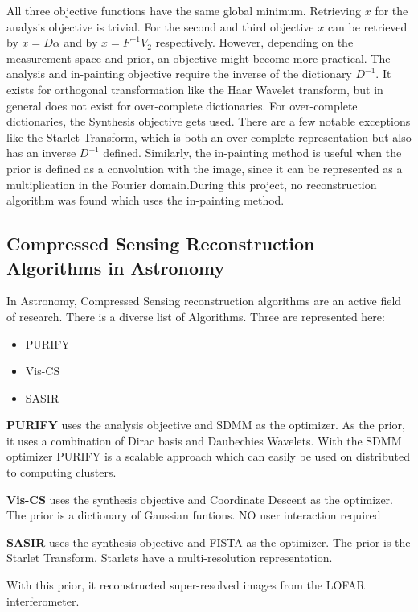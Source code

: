 All three objective functions have the same global minimum. Retrieving $x$ for the analysis objective is trivial. For the second and third objective $x$ can be retrieved by $x = D\alpha$ and by $x = F^{-1}V_2$ respectively. However, depending on the measurement space and prior, an objective might become more practical. The analysis and in-painting objective require the inverse of the dictionary $D^{-1}$. It exists for orthogonal transformation like the Haar Wavelet transform, but in general does not exist for over-complete dictionaries. For over-complete dictionaries, the Synthesis objective gets used. There are a few notable exceptions like the Starlet Transform, which is both an over-complete representation but also has an inverse $D^{-1}$ defined. Similarly, the in-painting method is useful when the prior is defined as a convolution with the image, since it can be represented as a multiplication in the Fourier domain.During this project, no reconstruction algorithm was found which uses the in-painting method.


\subsection{Compressed Sensing Reconstruction Algorithms in Astronomy}
In Astronomy, Compressed Sensing reconstruction algorithms are an active field of research. There is a diverse list of Algorithms. Three are represented here:
\begin{itemize}
	\item PURIFY \cite{carrillo2014purify}
	\item Vis-CS \cite{felix2017compressed}
	\item SASIR \cite{girard2015sparse}
\end{itemize}

\textbf{PURIFY} uses the analysis objective and SDMM as the optimizer. As the prior, it uses a combination of Dirac basis and Daubechies Wavelets. With the SDMM optimizer PURIFY is a scalable approach which can easily be used on distributed to computing clusters.

\textbf{Vis-CS} uses the synthesis objective and Coordinate Descent as the optimizer. The prior is a dictionary of Gaussian funtions.
 NO user interaction required

\textbf{SASIR} uses the synthesis objective and FISTA as the optimizer. The prior is the Starlet Transform. Starlets have a multi-resolution representation.

With this prior, it reconstructed super-resolved images from the LOFAR interferometer.


